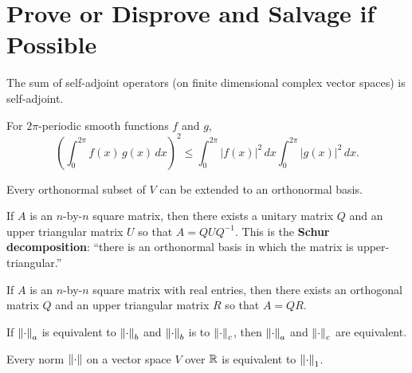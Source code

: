 \documentclass{homework}
\begin{document}
\section{Prove or Disprove and Salvage if Possible}

\begin{problem}
  The sum of self-adjoint operators (on finite dimensional complex vector spaces) is self-adjoint.
\end{problem}

\begin{problem}\label{cauchy-schwarz-application}For $2\pi$-periodic smooth functions $f$ and $g$,
  \[
    \left( \int_{0}^{2\pi} f(x) \, g(x) \, dx  \right)^2 \leq
    \int_{0}^{2\pi} \left| f(x) \right|^2 \, dx
    \int_{0}^{2\pi} \left| g(x) \right|^2 \, dx.
  \]
\end{problem}

\begin{problem}
  Every orthonormal subset of $V$ can be extended to an orthonormal basis.
\end{problem}

\begin{problem}\label{schur-decomposition}If $A$ is an $n$-by-$n$ square matrix, then there exists a unitary matrix $Q$ and an upper triangular matrix $U$ so that $A = QUQ^{-1}$.  This is the \textbf{Schur decomposition}: ``there is an orthonormal basis in which the matrix is upper-triangular.''
\end{problem}%

\begin{problem}\label{qr-decomposition}If $A$ is an $n$-by-$n$ square matrix with real entries, then there exists an orthogonal matrix $Q$ and an upper triangular matrix $R$ so that $A = QR$.
\end{problem}

\begin{problem}\label{transitivity-of-equivalence-of-norms}If $\left\lVert\cdot\right\rVert_a$ is equivalent to $\left\lVert\cdot\right\rVert_b$ and $\left\lVert\cdot\right\rVert_b$ is to $\left\lVert\cdot\right\rVert_c$, then $\left\lVert\cdot\right\rVert_a$ and $\left\lVert\cdot\right\rVert_c$ are equivalent. %
\end{problem}

\begin{problem}\label{equivalence-of-norms}Every norm $\left\lVert\cdot\right\rVert$ on a vector space $V$ over $\mathbb{R}$ is equivalent to $\left\lVert\cdot\right\rVert_1$.
\end{problem}%
\end{document}

